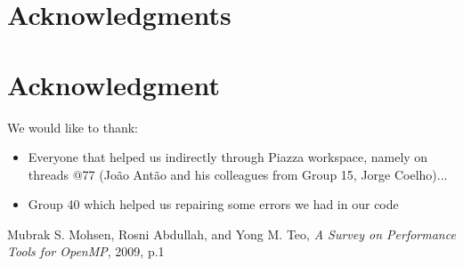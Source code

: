 \documentclass[10pt,journal,compsoc]{IEEEtran}
\begin{document}
\ifCLASSOPTIONcompsoc
  \section*{Acknowledgments}
\else
  \section*{Acknowledgment}
\fi


We would like to thank:
\begin{itemize}
    \item Everyone that helped us indirectly through Piazza workspace, namely on threads @77 (João Antão and his colleagues from Group 15, Jorge Coelho)...
    \item Group 40 which helped us repairing some errors we had in our code 
\end{itemize}

\ifCLASSOPTIONcaptionsoff
  \newpage
\fi


\begin{thebibliography}{1}

Mubrak S. Mohsen, Rosni Abdullah, and Yong M. Teo, \emph{A Survey on Performance Tools for OpenMP}, 2009, p.1

\end{thebibliography}

\end{document}

